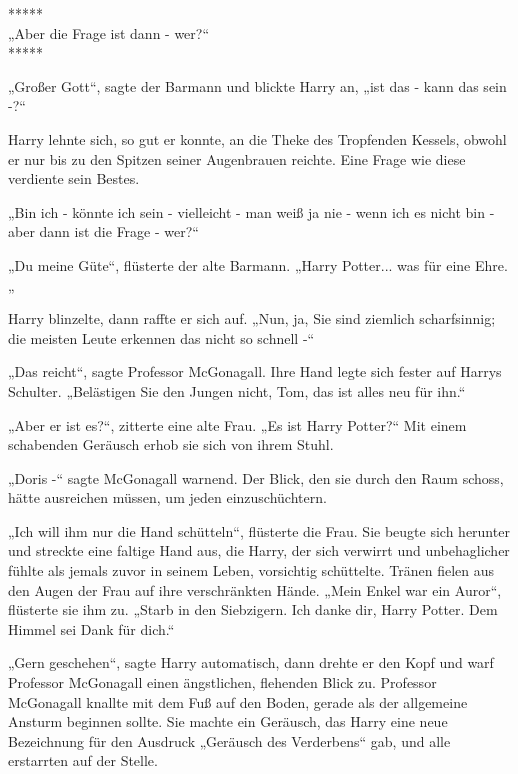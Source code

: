 

\hypertarget{die-realituxe4t-mit-ihren-alternativen-vergleichen}{%

*****\\ „Aber die Frage ist dann - wer?“ ~\\ *****

„Großer Gott“, sagte der Barmann und blickte Harry an, „ist das - kann das sein -?“

Harry lehnte sich, so gut er konnte, an die Theke des Tropfenden Kessels, obwohl er nur bis zu den Spitzen seiner Augenbrauen reichte. Eine Frage wie diese verdiente sein Bestes.

„Bin ich - könnte ich sein - vielleicht - man weiß ja nie - wenn ich es nicht bin - aber dann ist die Frage - wer?“

„Du meine Güte“, flüsterte der alte Barmann. „Harry Potter... was für eine Ehre.„

Harry blinzelte, dann raffte er sich auf. „Nun, ja, Sie sind ziemlich scharfsinnig; die meisten Leute erkennen das nicht so schnell -“

„Das reicht“, sagte Professor McGonagall. Ihre Hand legte sich fester auf Harrys Schulter. „Belästigen Sie den Jungen nicht, Tom, das ist alles neu für ihn.“

„Aber er ist es?“, zitterte eine alte Frau. „Es ist Harry Potter?“ Mit einem schabenden Geräusch erhob sie sich von ihrem Stuhl.

„Doris -“ sagte McGonagall warnend. Der Blick, den sie durch den Raum schoss, hätte ausreichen müssen, um jeden einzuschüchtern.

„Ich will ihm nur die Hand schütteln“, flüsterte die Frau. Sie beugte sich herunter und streckte eine faltige Hand aus, die Harry, der sich verwirrt und unbehaglicher fühlte als jemals zuvor in seinem Leben, vorsichtig schüttelte. Tränen fielen aus den Augen der Frau auf ihre verschränkten Hände. „Mein Enkel war ein Auror“, flüsterte sie ihm zu. „Starb in den Siebzigern. Ich danke dir, Harry Potter. Dem Himmel sei Dank für dich.“

„Gern geschehen“, sagte Harry automatisch, dann drehte er den Kopf und warf Professor McGonagall einen ängstlichen, flehenden Blick zu. Professor McGonagall knallte mit dem Fuß auf den Boden, gerade als der allgemeine Ansturm beginnen sollte. Sie machte ein Geräusch, das Harry eine neue Bezeichnung für den Ausdruck „Geräusch des Verderbens“ gab, und alle erstarrten auf der Stelle.

}
